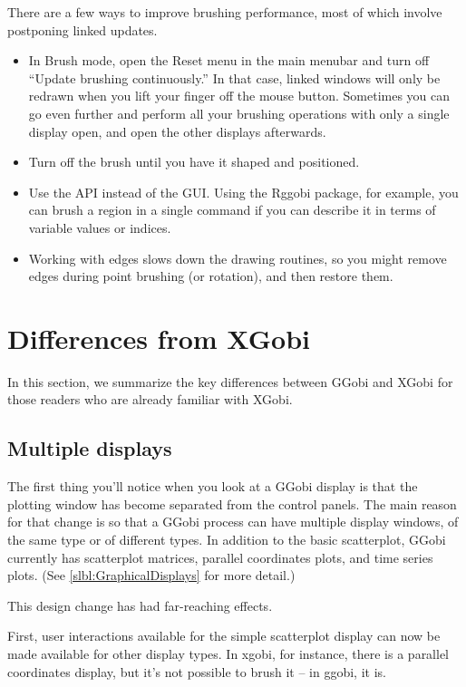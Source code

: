 \documentclass[11pt]{article}
\begin{document}
There are a few ways to improve brushing performance, most of which
involve postponing linked updates.  
\begin{itemize}
\item In Brush mode, open the Reset menu in the main menubar and turn off
 ``Update brushing continuously.''  In that case, linked windows will only
 be redrawn when you lift your finger off the mouse button.  Sometimes you
 can go even further and perform all your brushing operations with only
 a single display open, and open the other displays afterwards.
\item Turn off the brush until you have it shaped and positioned.
\item Use the API instead of the GUI.  Using the Rggobi package, for
 example, you can brush a region in a single command if you can describe
 it in terms of variable values or indices.
\item Working with edges slows down the drawing routines, so you might
 remove edges during point brushing (or rotation), and then restore them.
\end{itemize}

\newpage
\section{Differences from XGobi}
\label{slbl:xgobi}

In this section, we summarize the key differences between GGobi
and XGobi for those readers who are already familiar with XGobi.

\subsection {Multiple displays}

The first thing you'll notice when you look at a GGobi display is
that the plotting window has become separated from the control
panels.  The main reason for that change is so that a GGobi process
can have multiple display windows, of the same type or of different
types.  In addition to the basic scatterplot, GGobi currently has
scatterplot matrices, parallel coordinates plots, and time series
plots.  (See \ref{slbl:GraphicalDisplays} for more detail.)

This design change has had far-reaching effects.

First, user interactions available for the simple scatterplot display
can now be made available for other display types.  In xgobi, for
instance, there is a parallel coordinates display, but it's not
possible to brush it -- in ggobi, it is.
\end{document}
